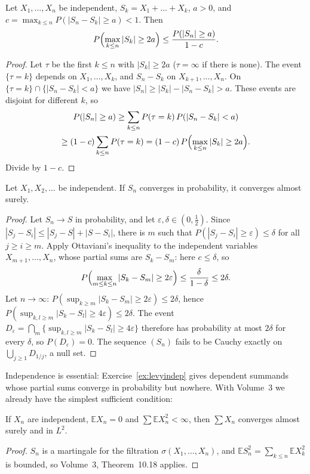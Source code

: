 \begin{lemma}\label{lem:ottaviani}
Let $X_1,\dots,X_n$ be independent, $S_k=X_1+\dots+X_k$, $a>0$, and $c=\max_{k\le n}P(|S_n-S_k|\ge a)<1$. Then
\[
P\Bigl(\max_{k\le n}|S_k|\ge2a\Bigr)\le\frac{P(|S_n|\ge a)}{1-c}.
\]
\end{lemma}
\begin{proof}
Let $\tau$ be the first $k\le n$ with $|S_k|\ge2a$ ($\tau=\infty$ if there is none). The event $\{\tau=k\}$ depends on
$X_1,\dots,X_k$, and $S_n-S_k$ on $X_{k+1},\dots,X_n$. On $\{\tau=k\}\cap\{|S_n-S_k|<a\}$ we have $|S_n|\ge|S_k|-|S_n-S_k|>a$.
These events are disjoint for different $k$, so
\[
\begin{gathered}
P(|S_n|\ge a)\ge\sum_{k\le n}P(\tau=k)\,P(|S_n-S_k|<a)\\\ge(1-c)\sum_{k\le n}P(\tau=k)=(1-c)\,P\Bigl(\max_{k\le n}|S_k|\ge2a\Bigr).
\end{gathered}
\]
Divide by $1-c$.
\end{proof}

\begin{theorem}[L\'evy, 1937]\label{thm:levyequiv}
Let $X_1,X_2,\dots$ be independent. If $S_n$ converges in probability, it converges almost surely.
\end{theorem}
\begin{proof}
Let $S_n\to S$ in probability, and let $\varepsilon,\delta\in(0,\frac12)$. Since $|S_j-S_i|\le|S_j-S|+|S-S_i|$, there is $m$
such that $P(|S_j-S_i|\ge\varepsilon)\le\delta$ for all $j\ge i\ge m$. Apply Ottaviani's inequality to the independent variables
$X_{m+1},\dots,X_n$, whose partial sums are $S_k-S_m$: here $c\le\delta$, so
\[
P\Bigl(\max_{m\le k\le n}|S_k-S_m|\ge2\varepsilon\Bigr)\le\frac{\delta}{1-\delta}\le2\delta.
\]
Let $n\to\infty$: $P(\sup_{k\ge m}|S_k-S_m|\ge2\varepsilon)\le2\delta$, hence $P(\sup_{k,l\ge m}|S_k-S_l|\ge4\varepsilon)\le2\delta$. The
event $D_\varepsilon=\bigcap_m\{\sup_{k,l\ge m}|S_k-S_l|\ge4\varepsilon\}$ therefore has probability at most $2\delta$ for every
$\delta$, so $P(D_\varepsilon)=0$. The sequence $(S_n)$ fails to be Cauchy exactly on $\bigcup_{j\ge1}D_{1/j}$, a null set.
\end{proof}

Independence is essential: Exercise~\ref{ex:levyindep} gives dependent summands whose partial sums converge in probability but
nowhere. With Volume~3 we already have the simplest sufficient condition:

\begin{proposition}\label{prop:l2series}
If $X_n$ are independent, $\mathbb E X_n=0$ and $\sum\mathbb E X_n^2<\infty$, then $\sum X_n$ converges almost surely and in $L^2$.
\end{proposition}
\begin{proof}
$S_n$ is a martingale for the filtration $\sigma(X_1,\dots,X_n)$, and $\mathbb E S_n^2=\sum_{k\le n}\mathbb E X_k^2$ is bounded,
so Volume~3, Theorem~10.18 applies.
\end{proof}

